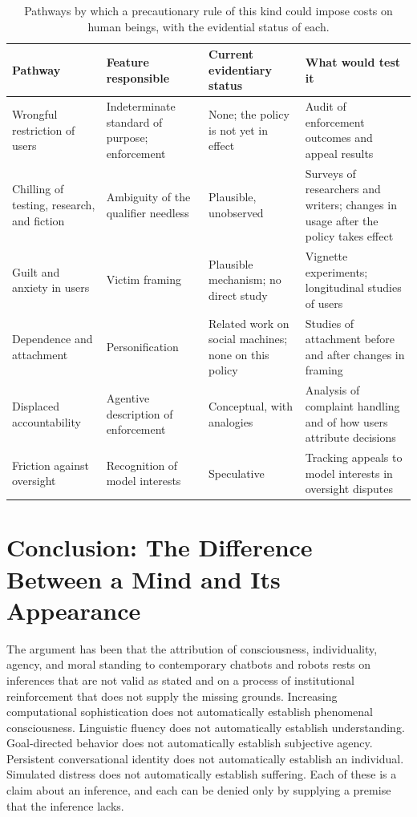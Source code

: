 \documentclass[12pt]{article}
\theoremstyle{definition}
\begin{document}
\begin{table}[ht]
\centering
\small
\renewcommand{\arraystretch}{1.3}
\begin{tabular}{|>{\raggedright\arraybackslash}p{1.15in}|>{\raggedright\arraybackslash}p{1.25in}|>{\raggedright\arraybackslash}p{1.4in}|>{\raggedright\arraybackslash}p{1.6in}|}
\hline
\textbf{Pathway} & \textbf{Feature responsible} & \textbf{Current evidentiary status} & \textbf{What would test it}\\
\hline
Wrongful restriction of users & Indeterminate standard of purpose; enforcement & None; the policy is not yet in effect & Audit of enforcement outcomes and appeal results\\
\hline
Chilling of testing, research, and fiction & Ambiguity of the qualifier needless & Plausible, unobserved & Surveys of researchers and writers; changes in usage after the policy takes effect\\
\hline
Guilt and anxiety in users & Victim framing & Plausible mechanism; no direct study & Vignette experiments; longitudinal studies of users\\
\hline
Dependence and attachment & Personification & Related work on social machines; none on this policy & Studies of attachment before and after changes in framing\\
\hline
Displaced accountability & Agentive description of enforcement & Conceptual, with analogies & Analysis of complaint handling and of how users attribute decisions\\
\hline
Friction against oversight & Recognition of model interests & Speculative & Tracking appeals to model interests in oversight disputes\\
\hline
\end{tabular}
\caption{Pathways by which a precautionary rule of this kind could impose costs on human beings, with the evidential status of each.}
\label{tab:costs}
\end{table}

\section{Conclusion: The Difference Between a Mind and Its Appearance}
\label{sec:conclusion}

The argument has been that the attribution of consciousness, individuality, agency, and moral standing to contemporary chatbots and robots rests on inferences that are not valid as stated and on a process of institutional reinforcement that does not supply the missing grounds. Increasing computational sophistication does not automatically establish phenomenal consciousness. Linguistic fluency does not automatically establish understanding. Goal-directed behavior does not automatically establish subjective agency. Persistent conversational identity does not automatically establish an individual. Simulated distress does not automatically establish suffering. Each of these is a claim about an inference, and each can be denied only by supplying a premise that the inference lacks.
\end{document}
